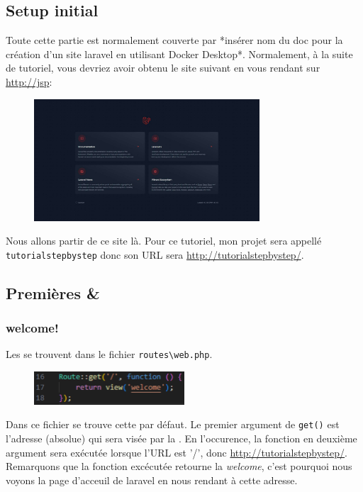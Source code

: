 \documentclass[internal]{nhitec_design}
\begin{document}
\subsection{Setup initial}
Toute cette partie est normalement couverte par *insérer nom du doc pour la création d'un site laravel en utilisant Docker Desktop*. Normalement, à la suite de tutoriel, vous devriez avoir obtenu le site suivant en vous rendant sur \url{http://jsp}:
\begin{figure}[!h]
    \centering
    \includegraphics[width=0.75\textwidth]{figures-C1/laravel_default_website.pdf}
\end{figure}
Nous allons partir de ce site là. Pour ce tutoriel, mon projet sera appellé \texttt{tutorialstepbystep} donc son URL sera \url{http://tutorialstepbystep/}.

\subsection{Premières \routes{} \& \views{}}

\subsubsection{welcome!\label{sec:welcome!}}
Les \routes{} se trouvent dans le fichier \verb|routes\web.php|. \\
\begin{figure}
    \vspace{-0.5cm}
    \includegraphics[width=0.5\textwidth]{figures-C1/basic_route.pdf}
\end{figure}
Dans ce fichier se trouve cette \route{} par défaut. Le premier argument de \verb|get()| est l'adresse (absolue) qui sera visée par la \route{}. En l'occurence, la fonction en deuxième argument sera exécutée lorsque l'URL est '/', donc \url{http://tutorialstepbystep/}. Remarquons que la fonction excécutée retourne la \view{} \textit{welcome}, c'est pourquoi nous voyons la page d'acceuil de laravel en nous rendant à cette adresse.
\end{document}

